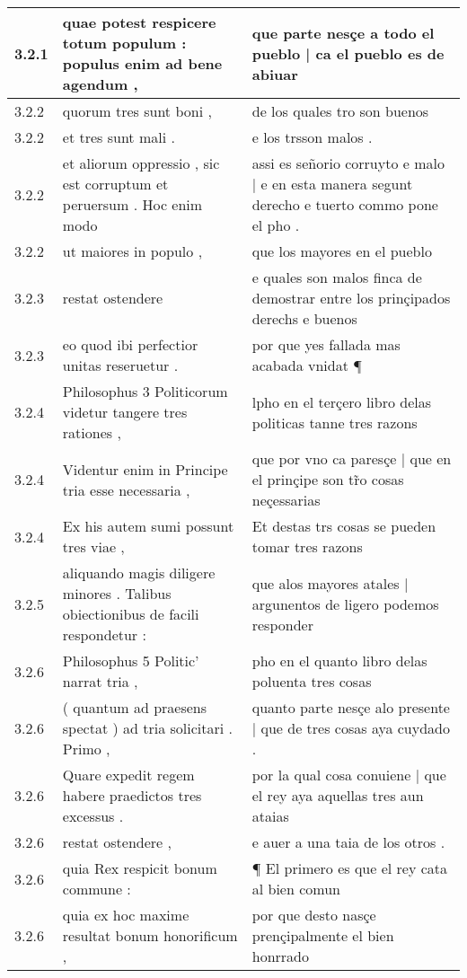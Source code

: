 \begin{tabular}{|p{1cm}|p{6.5cm}|p{6.5cm}|}
3.2.1 & quae potest respicere totum populum : populus enim ad bene agendum , & que parte nesçe a todo el pueblo | ca el pueblo es de abiuar \\\hline
3.2.2 & quorum tres sunt boni , & de los quales tro son buenos \\\hline
3.2.2 & et tres sunt mali . & e los trsson malos . \\\hline
3.2.2 & et aliorum oppressio , sic est corruptum et peruersum . Hoc enim modo & assi es señorio corruyto e malo | e en esta manera segunt derecho e tuerto commo pone el pho . \\\hline
3.2.2 & ut maiores in populo , & que los mayores en el pueblo \\\hline
3.2.3 & restat ostendere & e quales son malos finca de demostrar entre los prinçipados derechs e buenos \\\hline
3.2.3 & eo quod ibi perfectior unitas reseruetur . & por que yes fallada mas acabada vnidat ¶ \\\hline
3.2.4 & Philosophus 3 Politicorum videtur tangere tres rationes , & lpho en el terçero libro delas politicas tanne tres razons \\\hline
3.2.4 & Videntur enim in Principe tria esse necessaria , & que por vno ca paresçe | que en el prinçipe son tr̃o cosas neçessarias \\\hline
3.2.4 & Ex his autem sumi possunt tres viae , & Et destas trs cosas se pueden tomar tres razons \\\hline
3.2.5 & aliquando magis diligere minores . Talibus obiectionibus de facili respondetur : & que alos mayores atales | argunentos de ligero podemos responder \\\hline
3.2.6 & Philosophus 5 Politic’ narrat tria , & pho en el quanto libro delas poluenta tres cosas \\\hline
3.2.6 & ( quantum ad praesens spectat ) ad tria solicitari . Primo , & quanto parte nesçe alo presente | que de tres cosas aya cuydado . \\\hline
3.2.6 & Quare expedit regem habere praedictos tres excessus . & por la qual cosa conuiene | que el rey aya aquellas tres aun ataias \\\hline
3.2.6 & restat ostendere , & e auer a una taia de los otros . \\\hline
3.2.6 & quia Rex respicit bonum commune : & ¶ El primero es que el rey cata al bien comun \\\hline
3.2.6 & quia ex hoc maxime resultat bonum honorificum , & por que desto nasçe prençipalmente el bien honrrado \\\hline

\end{tabular}
